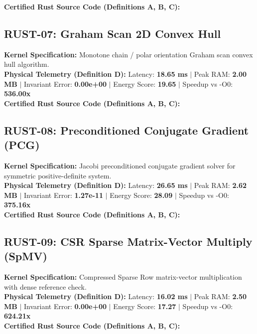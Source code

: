 \textbf{Certified Rust Source Code (Definitions A, B, C):}


\vspace{1em}
\subsection{RUST-07: Graham Scan 2D Convex Hull}
\textbf{Kernel Specification:} Monotone chain / polar orientation Graham scan convex hull algorithm.\\
\textbf{Physical Telemetry (Definition D):} Latency: \textbf{18.65 ms} $|$ Peak RAM: \textbf{2.00 MB} $|$ Invariant Error: \textbf{0.00e+00} $|$ Energy Score: \textbf{19.65} $|$ Speedup vs -O0: \textbf{536.00x}\\

\textbf{Certified Rust Source Code (Definitions A, B, C):}


\vspace{1em}
\subsection{RUST-08: Preconditioned Conjugate Gradient (PCG)}
\textbf{Kernel Specification:} Jacobi preconditioned conjugate gradient solver for symmetric positive-definite system.\\
\textbf{Physical Telemetry (Definition D):} Latency: \textbf{26.65 ms} $|$ Peak RAM: \textbf{2.62 MB} $|$ Invariant Error: \textbf{1.27e-11} $|$ Energy Score: \textbf{28.09} $|$ Speedup vs -O0: \textbf{375.16x}\\

\textbf{Certified Rust Source Code (Definitions A, B, C):}


\vspace{1em}
\subsection{RUST-09: CSR Sparse Matrix-Vector Multiply (SpMV)}
\textbf{Kernel Specification:} Compressed Sparse Row matrix-vector multiplication with dense reference check.\\
\textbf{Physical Telemetry (Definition D):} Latency: \textbf{16.02 ms} $|$ Peak RAM: \textbf{2.50 MB} $|$ Invariant Error: \textbf{0.00e+00} $|$ Energy Score: \textbf{17.27} $|$ Speedup vs -O0: \textbf{624.21x}\\

\textbf{Certified Rust Source Code (Definitions A, B, C):}


